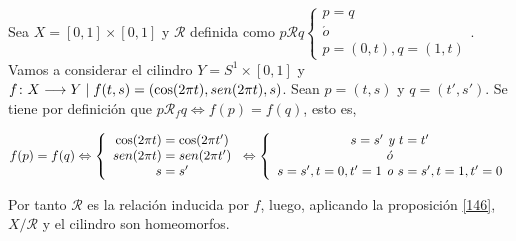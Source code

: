 \documentclass[GTS.tex]{subfiles}
\begin{document}
\vspace{0.2cm}

\begin{ej}[Cilindro] Sea $X=[0,1]\times [0,1]$ y $\mathcal{R}$ definida como $p\mathcal{R}q\begin{cases}
p=q\\
\acute{o}\\
p=(0,t),q=(1,t)
\end{cases}$. Vamos a considerar el cilindro $Y=S^1\times[0,1]$ y $f\colon{X}\longrightarrow{Y}\mid f(t,s)=(\cos(2\pi t), sen (2\pi t), s)$. Sean $p=(t,s)$ y $q=(t',s')$. Se tiene por definición que $p\mathcal{R}_f q\Leftrightarrow f(p)=f(q)$, esto es,

\[
f(p)=f(q)\Leftrightarrow\left\{
\begin{array}{c}
\cos(2\pi t)=\cos(2\pi t')\\
sen (2\pi t)= sen (2\pi t')\\
s=s'
\end{array}\right. \Leftrightarrow\left\{\begin{array}{c}
s=s'\textit{ y } t=t'\\
\acute{o}\\
s=s',t=0,t'=1\textit{ o }s=s',t=1,t'=0
\end{array}\right.
\]

Por tanto $\mathcal{R}$ es la relación inducida por $f$, luego, aplicando la proposición \ref{146}, $X/\mathcal{R}$ y el cilindro son homeomorfos.
\end{ej}
\end{document}
